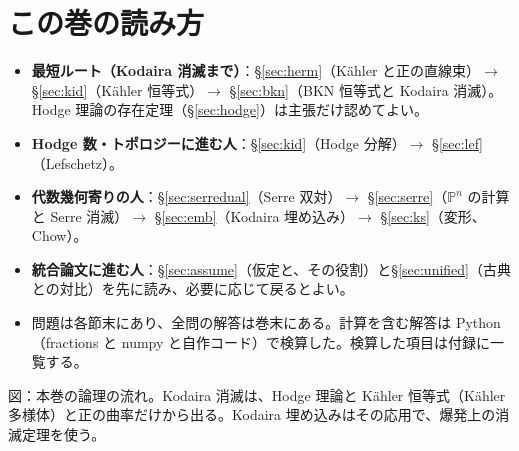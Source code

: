\section*{この巻の読み方}
\begin{itemize}
\item \textbf{最短ルート（Kodaira 消滅まで）}：\S\ref{sec:herm}（Kähler と正の直線束）$\to$ \S\ref{sec:kid}（Kähler 恒等式）$\to$ \S\ref{sec:bkn}（BKN 恒等式と Kodaira 消滅）。Hodge 理論の存在定理（\S\ref{sec:hodge}）は主張だけ認めてよい。
\item \textbf{Hodge 数・トポロジーに進む人}：\S\ref{sec:kid}（Hodge 分解）$\to$ \S\ref{sec:lef}（Lefschetz）。
\item \textbf{代数幾何寄りの人}：\S\ref{sec:serredual}（Serre 双対）$\to$ \S\ref{sec:serre}（$\mathbb P^n$ の計算と Serre 消滅）$\to$ \S\ref{sec:emb}（Kodaira 埋め込み）$\to$ \S\ref{sec:ks}（変形、Chow）。
\item \textbf{統合論文に進む人}：\S\ref{sec:assume}（仮定と、その役割）と\S\ref{sec:unified}（古典との対比）を先に読み、必要に応じて戻るとよい。
\item 問題は各節末にあり、全問の解答は巻末にある。計算を含む解答は Python（fractions と numpy と自作コード）で検算した。検算した項目は付録に一覧する。
\end{itemize}
\begin{center}
\end{center}
{\small 図：本巻の論理の流れ。Kodaira 消滅は、Hodge 理論と Kähler 恒等式（Kähler 多様体）と正の曲率だけから出る。Kodaira 埋め込みはその応用で、爆発上の消滅定理を使う。}
